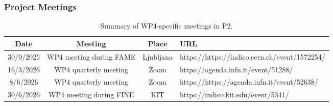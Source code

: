 \subsubsection*{Project Meetings}
\begin{table}[H]
    \centering
    \caption{Summary of WP4-specific meetings in P2.}
    {\color{black}\begin{tabularx}{\textwidth}{|c|c|c|X|} \hline
        \rowcolor{mycyan}
        \textbf{Date} & \textbf{Meeting} & \textbf{Place} & \textbf{URL} \\ \hline
        \hline         30/9/2025 & WP4 meeting during FAME & Ljubljana & https://https://indico.cern.ch/event/1572254/ \\ \hline 
        16/3/2026 & WP4 quarterly meeting & Zoom & https://agenda.infn.it/event/51288/  \\ 
        8/6/2026 & WP4 quarterly meeting & Zoom & https://https://agenda.infn.it/event/52638/ \\ \hline   
        30/6/2026 & WP4 meeting during FINE & KIT & https://indico.kit.edu/event/5341/ \\ \hline 
       
     \end{tabularx}}
    \label{tab:wp4-meetings}
\end{table}


